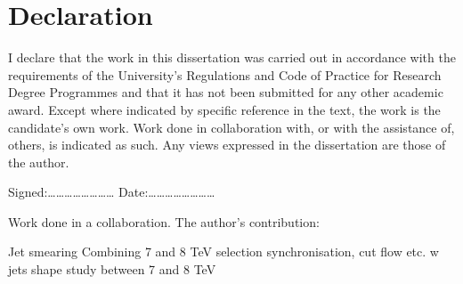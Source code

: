 \chapter*{Declaration}

I declare that the work in this dissertation was carried out in accordance with the requirements of the University's 
Regulations and Code of Practice for Research Degree Programmes and that it has not been submitted for any other academic 
award. Except where indicated by specific reference in the text, the work is the candidate's own work. Work done in 
collaboration with, or with the assistance of, others, is indicated as such. Any views expressed in the dissertation are 
those of the author.

\vspace{5cm}
\noindent
Signed:\ldots\ldots\ldots\ldots\ldots\ldots\ldots\ldots \hfill
Date:\ldots\ldots\ldots\ldots\ldots\ldots\ldots\ldots


Work done in a collaboration.
The author's contribution:

Jet smearing
Combining 7 and 8 TeV selection synchronisation, cut flow etc.
w jets shape study between 7 and 8 TeV
